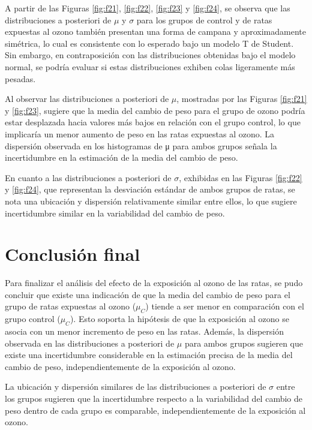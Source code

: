 \documentclass[
]{article}
\begin{document}
A partir de las Figuras \ref{fig:f21}, \ref{fig:f22}, \ref{fig:f23} y \ref{fig:f24}, se observa que las distribuciones a posteriori de \(\mu\) y \(\sigma\) para los grupos de control y de ratas expuestas al ozono también presentan una forma de campana y aproximadamente simétrica, lo cual es consistente con lo esperado bajo un modelo T de Student. Sin embargo, en contraposición con las distribuciones obtenidas bajo el modelo normal, se podría evaluar si estas distribuciones exhiben colas ligeramente más pesadas.

Al observar las distribuciones a posteriori de \(\mu\), mostradas por las Figuras \ref{fig:f21} y \ref{fig:f23}, sugiere que la media del cambio de peso para el grupo de ozono podría estar desplazada hacia valores más bajos en relación con el grupo control, lo que implicaría un menor aumento de peso en las ratas expuestas al ozono. La dispersión observada en los histogramas de μ para ambos grupos señala la incertidumbre en la estimación de la media del cambio de peso.

En cuanto a las distribuciones a posteriori de \(\sigma\), exhibidas en las Figuras \ref{fig:f22} y \ref{fig:f24}, que representan la desviación estándar de ambos grupos de ratas, se nota una ubicación y dispersión relativamente similar entre ellos, lo que sugiere incertidumbre similar en la variabilidad del cambio de peso.

\section{Conclusión final}\label{conclusiuxf3n-final}

Para finalizar el análisis del efecto de la exposición al ozono de las ratas, se pudo concluir que existe una indicación de que la media del cambio de peso para el grupo de ratas expuestas al ozono (\(\mu_C\)) tiende a ser menor en comparación con el grupo control (\(\mu_C\)). Esto soporta la hipótesis de que la exposición al ozono se asocia con un menor incremento de peso en las ratas. Además, la dispersión observada en las distribuciones a posteriori de \(\mu\) para ambos grupos sugieren que existe una incertidumbre considerable en la estimación precisa de la media del cambio de peso, independientemente de la exposición al ozono.

La ubicación y dispersión similares de las distribuciones a posteriori de \(\sigma\) entre los grupos sugieren que la incertidumbre respecto a la variabilidad del cambio de peso dentro de cada grupo es comparable, independientemente de la exposición al ozono.
\end{document}
